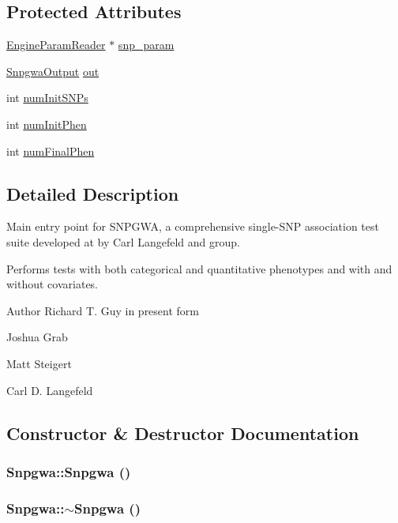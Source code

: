 \subsection*{Protected Attributes}
\begin{DoxyCompactItemize}
\item 
\hyperlink{classEngineParamReader}{EngineParamReader} $\ast$ \hyperlink{classSnpgwa_a9b2d0153adca8f2c195316160a5f5e6b}{snp\_\-param}
\item 
\hyperlink{classSnpgwaOutput}{SnpgwaOutput} \hyperlink{classSnpgwa_a6c7b080ebb55447368f6f4fc7b6e44b4}{out}
\item 
int \hyperlink{classSnpgwa_ad2186220f31270d57c707e2ab845f805}{numInitSNPs}
\item 
int \hyperlink{classSnpgwa_a8354d2686850eab77dd904721dd274f7}{numInitPhen}
\item 
int \hyperlink{classSnpgwa_a02d3778a5605bd3fa13b2ff48c87382a}{numFinalPhen}
\end{DoxyCompactItemize}


\subsection{Detailed Description}
Main entry point for SNPGWA, a comprehensive single-\/SNP association test suite developed at by Carl Langefeld and group.

Performs tests with both categorical and quantitative phenotypes and with and without covariates.

\begin{DoxyAuthor}{Author}
Richard T. Guy in present form 

Joshua Grab 

Matt Steigert 

Carl D. Langefeld 
\end{DoxyAuthor}


\subsection{Constructor \& Destructor Documentation}
\hypertarget{classSnpgwa_af6bc909553a0297002b7863bb8f36b9f}{
\subsubsection[{Snpgwa}]{\setlength{\rightskip}{0pt plus 5cm}Snpgwa::Snpgwa ()}}
\label{classSnpgwa_af6bc909553a0297002b7863bb8f36b9f}
\hypertarget{classSnpgwa_a5c8b9b6f8e59ce1ae40f2a6fe3fbee52}{
\subsubsection[{$\sim$Snpgwa}]{\setlength{\rightskip}{0pt plus 5cm}Snpgwa::$\sim$Snpgwa ()}}
\label{classSnpgwa_a5c8b9b6f8e59ce1ae40f2a6fe3fbee52}


